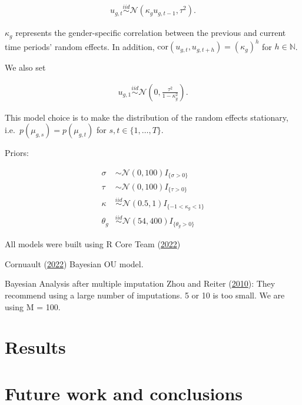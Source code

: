\documentclass[
  12pt,
]{article}
\begin{document}
\begin{align}
u_{g,t} \overset{iid}{\sim}\mathcal{N}(\kappa_g u_{g,t-1} , \tau^2).
\label{eq:ar1}
\end{align}

\(\kappa_g\) represents the gender-specific correlation between the
previous and current time periods' random effects. In addition,
\(\text{cor}(u_{g,t},u_{g,t+h}) = (\kappa_g)^h\) for
\(h \in \mathbb{N}\).

We also set

\begin{align}
u_{g,1} \overset{iid}{\sim}\mathcal{N}\left(0,\frac{\tau^2}{1-\kappa_g^2}\right).
\label{eq:u1}
\end{align}

This model choice is to make the distribution of the random effects
stationary, i.e.~\(p(\mu_{g,s}) = p(\mu_{g,t})\) for
\(s,t \in \{1,\dots,T\}\).

Priors:

\begin{align}
\sigma & \sim \mathcal{N}(0,100)I_{\{\sigma > 0\}} \nonumber \\
\tau & \sim \mathcal{N}(0,100)I_{\{\tau > 0\}} \nonumber \\
\kappa & \overset{iid}{\sim}\mathcal{N}(0.5,1)I_{\{-1 < \kappa_g < 1\}} \nonumber \\
\theta_g & \overset{iid}{\sim}\mathcal{N}(54,400)I_{\{\theta_g > 0\}}
\label{eq:priors}
\end{align}

All models were built using R Core Team
(\protect\hyperlink{ref-R2022language}{2022})

Cornuault (\protect\hyperlink{ref-Cornault2022}{2022}) Bayesian OU
model.

Bayesian Analysis after multiple imputation Zhou and Reiter
(\protect\hyperlink{ref-ZhouReiter2009}{2010}): They recommend using a
large number of imputations. 5 or 10 is too small. We are using M = 100.

\hypertarget{sec:results}{%
\section{Results}\label{sec:results}}

\hypertarget{sec:conclusions}{%
\section{Future work and conclusions}\label{sec:conclusions}}
\end{document}
